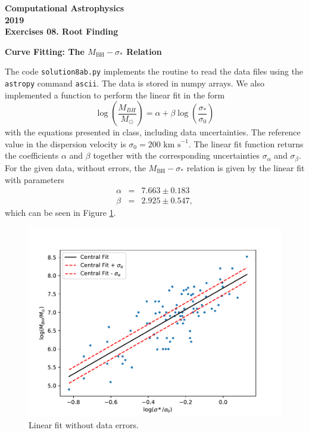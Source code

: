 \documentclass[11pt]{article}
\begin{document}
\begin{center}
\large \bf Computational Astrophysics \rm \\
2019\\
{\small Exercises 08. Root Finding}
\end{center}

{\bf Curve Fitting: The $M_\mathrm{BH}-\sigma_*$ Relation }

The code {\tt solution8ab.py} implements the routine to read the data files using the {\tt astropy} command {\tt ascii}. The data is stored in numpy arrays. We also implemented a function to perform the linear fit in the form 
\begin{equation}
\log \left( \frac{M_{BH}}{M_{\odot }} \right) = \alpha + \beta \log \left( \frac{\sigma_{*} }{\sigma_0 }  \right)
\end{equation}
with the equations presented in class, including  data uncertainties. The reference value in the dispersion velocity is $\sigma_0 = 200 \text{ km s}^{-1}$. The linear fit function returns the coefficients $\alpha$ and $\beta$ together with the corresponding uncertainties $\sigma_{\alpha}$ and $\sigma_{\beta}$. \\

For the given data, without errors,  the $M_\mathrm{BH}-\sigma_*$ relation is given by the linear fit with parameters
\begin{eqnarray}
\alpha &=& 7.663 \pm 0.183 \\
\beta &=&  2.925 \pm 0.547,
\end{eqnarray}
which can be seen in Figure \ref{fig:noerrorfit}.

\begin{figure}[h]
\centering
\includegraphics[scale=0.5]{M-sigma_no_error.pdf}
\caption{Linear fit without data errors.}
\label{fig:noerrorfit}
\end{figure}
\end{document}
